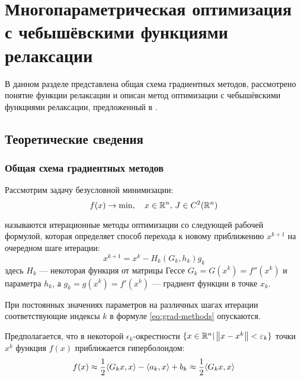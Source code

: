 \section{Многопараметрическая оптимизация\\
  с чебышёвскими функциями релаксации}
\label{sec:relch}

В данном разделе представлена общая схема градиентных методов,
рассмотрено понятие функции релаксации и описан метод оптимизации с
чебышёвскими функциями релаксации, предложенный в
\cite{chernorutsky04}.

\subsection{Теоретические сведения}

\subsubsection{Общая схема градиентных методов}

Рассмотрим задачу безусловной минимизации:
\begin{equation}
  \label{eq:optim-problem-form}
  f(x) \to \min,\quad x \in \mathbb{R}^n,\, J \in C^2(\mathbb{R}^n)
\end{equation}

\begin{dfn}
   называются итерационные методы оптимизации со
  следующей рабочей формулой, которая определяет способ перехода к
  новому приближению $x^{k+1}$ на очередном шаге итерации:
  \begin{equation}
    \label{eq:grad-methods}
    x^{k+1} = x^k - H_k\left(G_k, h_k\right) g_k
  \end{equation}
  здесь $H_k$ — некоторая функция от матрицы Гессе $G_k = G(x^k) =
  f''(x^k)$ и параметра $h_k$, а $g_k = g(x^k) = f'(x^k)$ — градиент
  функции в точке $x_k$.
\end{dfn}

При постоянных значениях параметров на различных шагах итерации
соответствующие индексы $k$ в формуле \eqref{eq:grad-methods}
опускаются.

Предполагается, что в некоторой $\epsilon_k$-окрестности $\{x \in
\mathbb{R}^n | \left \lVert{x-x^k}\right \rVert < \varepsilon_k\}$ точки $x^k$ функция $f(x)$
приближается гиперболоидом:
\begin{equation}
  \label{eq:sqr-approx}
  f(x) \approx \frac{1}{2}{\left \langle G_k x, x \right \rangle} - {\left \langle a_k,x \right \rangle} + b_k \approx \frac{1}{2}{\left \langle G_k x, x \right \rangle}
\end{equation}

